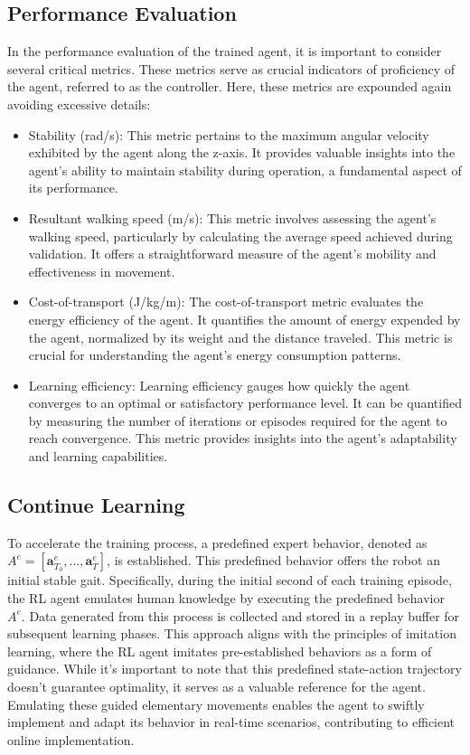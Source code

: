 \subsection{Performance Evaluation}
In the performance evaluation of the trained agent, it is important to consider several critical metrics. These metrics serve as crucial indicators of proficiency of the agent, referred to as the controller. Here, these metrics are expounded again avoiding excessive details:
\begin{itemize}
    \item Stability (rad/s): This metric pertains to the maximum angular velocity exhibited by the agent along the z-axis. It provides valuable insights into the agent's ability to maintain stability during operation, a fundamental aspect of its performance. 
    \item Resultant walking speed (m/s): This metric involves assessing the agent's walking speed, particularly by calculating the average speed achieved during validation. It offers a straightforward measure of the agent's mobility and effectiveness in movement.
    \item Cost-of-transport (J/kg/m):  The cost-of-transport metric evaluates the energy efficiency of the agent. It quantifies the amount of energy expended by the agent, normalized by its weight and the distance traveled. This metric is crucial for understanding the agent's energy consumption patterns.
    \item Learning efficiency:  Learning efficiency gauges how quickly the agent converges to an optimal or satisfactory performance level. It can be quantified by measuring the number of iterations or episodes required for the agent to reach convergence. This metric provides insights into the agent's adaptability and learning capabilities.
\end{itemize}

\subsection{Continue Learning}
To accelerate the training process, a predefined expert behavior, denoted as $A^e = [\textbf{a}_{T_0}^e, ..., \textbf{a}_T^e]$, is established\cite{jiSynthesizingOptimalGait2022}. This predefined behavior offers the robot an initial stable gait. Specifically, during the initial second of each training episode, the RL agent emulates human knowledge by executing the predefined behavior $A^e$. Data generated from this process is collected and stored in a replay buffer for subsequent learning phases. This approach aligns with the principles of imitation learning, where the RL agent imitates pre-established behaviors as a form of guidance. While it's important to note that this predefined state-action trajectory doesn't guarantee optimality, it serves as a valuable reference for the agent. Emulating these guided elementary movements enables the agent to swiftly implement and adapt its behavior in real-time scenarios, contributing to efficient online implementation.

